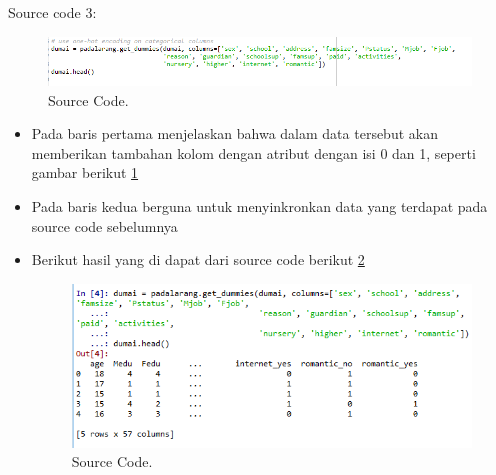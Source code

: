 Source code 3:
		\begin{figure}[ht]
		\centerline{\includegraphics[width=1\textwidth]{figures/im/imQ3.png}}
		\caption{Source Code.}
		\label{tigaQ}
		\end{figure}
\begin{itemize}
\item Pada baris pertama menjelaskan bahwa dalam data tersebut akan memberikan tambahan kolom dengan atribut dengan isi 0 dan 1, seperti gambar berikut \ref{tigaQ}
\item Pada baris kedua berguna untuk menyinkronkan data yang terdapat pada source code sebelumnya
\item Berikut hasil yang di dapat dari source code berikut \ref{tigaC}
		\begin{figure}[ht]
		\centerline{\includegraphics[width=1\textwidth]{figures/im/imCode3.png}}
		\caption{Source Code.}
		\label{tigaC}
		\end{figure}
\end{itemize}

